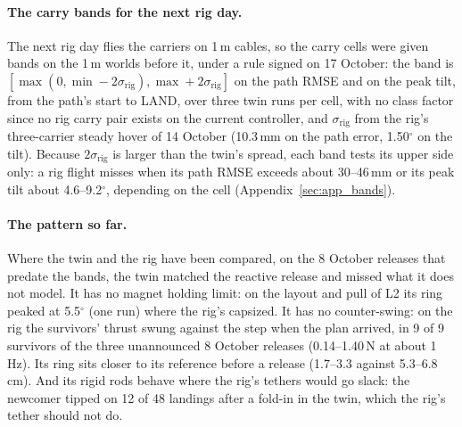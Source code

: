 \paragraph{The carry bands for the next rig day.} The next rig day flies the carriers on 1\,m cables, so the carry
cells were given bands on the 1\,m worlds before it, under a rule signed on 17 October: the band is
$[\max(0, \min - 2\sigma_{\mathrm{rig}}), \max + 2\sigma_{\mathrm{rig}}]$ on the path RMSE and on the peak tilt, from
the path's start to LAND, over three twin runs per cell, with no class factor since no rig carry pair exists on the
current controller, and $\sigma_{\mathrm{rig}}$ from the rig's three-carrier steady hover of 14 October (10.3\,mm on the
path error, 1.50$^\circ$ on the tilt). Because $2\sigma_{\mathrm{rig}}$ is larger than the twin's spread, each band
tests its upper side only: a rig flight misses when its path RMSE exceeds about 30--46\,mm or its peak tilt about
4.6--9.2$^\circ$, depending on the cell (Appendix~\ref{sec:app_bands}).

\paragraph{The pattern so far.} Where the twin and the rig have been compared, on the 8 October releases that
predate the bands, the twin matched the reactive release and missed what it does not model. It has no magnet holding limit: on the layout and pull of L2 its ring peaked at
5.5$^\circ$ (one run) where the rig's capsized. It has no counter-swing: on the rig the survivors' thrust
swung against the step when the plan arrived, in 9 of 9 survivors of the three unannounced 8 October releases
(0.14--1.40\,N at about 1\,Hz). Its ring sits closer
to its reference before a release (1.7--3.3 against 5.3--6.8\,cm). And its rigid rods behave where the rig's tethers
would go slack: the newcomer tipped on 12 of 48 landings after a fold-in in the twin, which the rig's tether should
not do.

